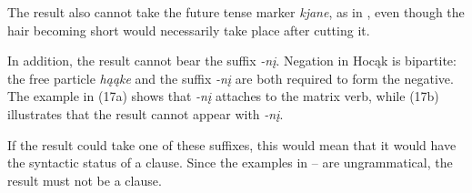 \documentclass[output=paper]{LSP/langsci}
\begin{document}
The result also cannot take the future tense marker \textit{kjane}, as in , even though the hair becoming short would necessarily take place after cutting it.

\begin{exe}


\end{exe}

In addition, the result cannot bear the  suffix \textit{-nį}. Negation in Hocąk is bipartite: the free particle \textit{hąąke} and the suffix \textit{-nį} are both required to form the negative. The example in (17a) shows that \textit{-nį} attaches to the matrix verb, while (17b) illustrates that the result cannot appear with \textit{-nį}.

\begin{exe}
\ex\label{ex:rosen:17}
\begin{xlist}



\end{xlist}
\end{exe}

If the result could take one of these suffixes, this would mean that it would have the syntactic status of a clause. Since the examples in -- are ungrammatical, the result must not be a clause.
 
\end{document}
